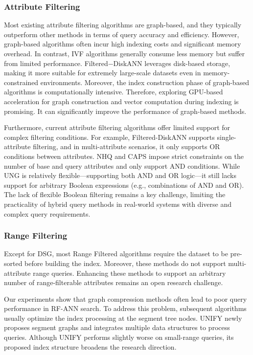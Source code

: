\documentclass[sigconf, nonacm]{acmart}
\begin{document}
\begin{sloppypar}
\subsubsection{\textbf{Attribute Filtering}}
Most existing attribute filtering algorithms are graph-based, and they typically outperform other methods in terms of query accuracy and efficiency. However, graph-based algorithms often incur high indexing costs and significant memory overhead. In contrast, IVF algorithms  generally consume less memory but suffer from limited performance. Filtered−DiskANN leverages disk-based storage, making it more suitable for extremely large-scale datasets even in memory-constrained environments. Moreover, the index construction phase of graph-based algorithms is computationally intensive. Therefore, exploring GPU-based acceleration for graph construction and vector computation during indexing is promising. It can significantly improve the performance of graph-based methods.


Furthermore, current attribute filtering algorithms offer limited support for complex filtering conditions. For example, Filtered-DiskANN  supports single-attribute filtering, and in multi-attribute scenarios, it only supports OR conditions between attributes. 
NHQ and CAPS impose strict constraints on the number of base and query attributes and only support AND conditions. While UNG is relatively flexible—supporting both AND and OR logic—it still lacks support for arbitrary Boolean expressions (e.g., combinations of AND and OR). The lack of flexible Boolean filtering remains a key challenge, limiting the practicality of hybrid query methods in real-world systems with diverse and complex query requirements.

\subsubsection{\textbf{Range Filtering}}

Except for DSG, most Range Filtered algorithms require the dataset to be pre-sorted before building the index. Moreover, these methods do not support multi-attribute range queries. Enhancing these methods to support an arbitrary number of range-filterable attributes remains an open research challenge.

Our experiments show that graph compression methods often lead to poor query performance in RF-ANN search. To address this problem, subsequent algorithms usually optimize the index processing at the segment tree nodes. UNIFY newly proposes segment graphs and integrates multiple data structures to process queries. Although UNIFY performs slightly worse on small-range queries, its proposed index structure broadens the research direction.


\end{sloppypar}
\end{document}

